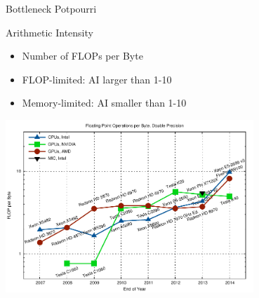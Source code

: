 
\begin{frame}[fragile]{Bottleneck Potpourri}

 \begin{block}{Arithmetic Intensity}
  \begin{itemize}
   \item Number of FLOPs per Byte
   \item FLOP-limited: AI larger than 1-10
   \item Memory-limited: AI smaller than 1-10
  \end{itemize}
 \end{block}

 \vspace*{-0.5cm}
 \begin{center}
   \includegraphics[width=0.7\textwidth]{figures/flop-per-byte-dp}
 \end{center}

\end{frame}


% 
% 
% 
% 
% 
% 



